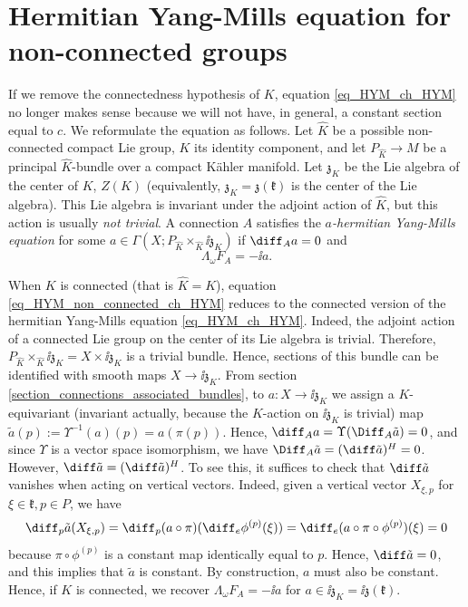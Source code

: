 \section{Hermitian Yang-Mills equation for non-connected groups} \label{section_HYM_eq_non_connected}
If we remove the connectedness hypothesis of \(K\), equation \eqref{eq_HYM_ch_HYM} no longer makes sense because we will not have, in general, a constant section equal to \(c\). We reformulate the equation as follows. Let \(\hat{K}\) be a possible non-connected compact Lie group, \(K\) its identity component, and let \(P_{\hat{K}}\to M\) be a principal \(\hat{K}\)-bundle over a compact Kähler manifold. Let \(\mathfrak{z}_K\) be the Lie algebra of the center of \(K\), \(Z(K)\) (equivalently, \(\mathfrak{z}_K=\mathfrak{z}(\mathfrak{k})\) is the center of the Lie algebra). This Lie algebra is invariant under the adjoint action of \(\hat{K}\), but this action is usually \textit{not trivial}. A connection \(A\) satisfies the \textit{\(a\)-hermitian Yang-Mills equation} for some \(a \in \Gamma(X; P_{\hat{K}} \times_{\hat{K}}\ii \mathfrak{z}_K)\) if \(\diff_A a=0\) and 
\begin{equation} \label{eq_HYM_non_connected_ch_HYM}
\Lambda_\omega F_A=-\ii a.
\end{equation}

\begin{obs} 
        When \(K\) is connected (that is \(\hat{K}=K\)), equation \eqref{eq_HYM_non_connected_ch_HYM} reduces to the connected version of the hermitian Yang-Mills equation \eqref{eq_HYM_ch_HYM}. Indeed, the adjoint action of a connected Lie group on the center of its Lie algebra is trivial. Therefore, \(P_{\hat{K}}\times_{\hat{K}}\ii \mathfrak{z}_K=X \times \ii\mathfrak{z}_K\) is a trivial bundle. Hence, sections of this bundle can be identified with smooth maps \(X \to \ii\mathfrak{z}_K\). From section \ref{section_connections_associated_bundles}, to \(a\colon X \to \ii \mathfrak{z}_K\) we assign a \(K\)-equivariant (invariant actually, because the \(K\)-action on \(\ii \mathfrak{z}_K\) is trivial) map \(\tilde{a}(p):=\Upsilon^{-1}(a)(p)=a(\pi(p))\). Hence, \(\diff_A a=\Upsilon(\Diff_A \tilde{a})=0\), and since \(\Upsilon\) is a vector space isomorphism, we have \(\Diff_A\tilde{a}=(\diff\tilde{a})^H=0\). However, \(\diff \tilde{a}=(\diff \tilde{a})^H\). To see this, it suffices to check that \(\diff \tilde{a}\) vanishes when acting on vertical vectors. Indeed, given a vertical vector \(X_{\xi, p}\) for \(\xi \in \mathfrak{k}, p \in P\), we have
        \[
        \diff_p \tilde{a}(X_{\xi, p})=\diff_p(a \circ \pi)(\diff_e\phi^{(p)}(\xi))=\diff_e(a\circ \pi \circ \phi^{(p)})(\xi)=0
        \]
        because \(\pi\circ \phi^{(p)}\) is a constant map identically equal to \(p\). Hence, \(\diff \tilde{a}=0\), and this implies that \(\tilde{a}\) is constant. By construction, \(a\) must also be constant. Hence, if \(K\) is connected, we recover \(\Lambda_\omega F_A=-\ii a\) for \(a \in \ii \mathfrak{z}_K=\ii \mathfrak{z}(\mathfrak{k})\).
\end{obs}
